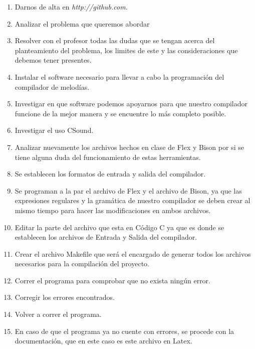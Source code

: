 \documentclass[12pt]{article}
\begin{document}
\begin{enumerate}
\item Darnos de alta en \emph{http://github.com}.
\item Analizar el problema que queremos abordar\\
\item Resolver  con el profesor todas las dudas que se tengan acerca del planteamiento del problema, los limites de este y las consideraciones que debemos tener presentes.\\
\item Instalar el software necesario para llevar a cabo la programación del compilador de melodías.\\
\item Investigar en que software podemos apoyarnos para que nuestro compilador funcione de la mejor manera y se encuentre lo más completo posible.\\
\item Investigar el uso CSound.\\
\item Analizar nuevamente los archivos hechos en clase de Flex y Bison por si se tiene alguna duda del funcionamiento de estas herramientas.\\
\item Se establecen los formatos de entrada y salida del compilador.
\item Se programan a la par el archivo de Flex y el archivo de Bison, ya que las expresiones regulares y la gramática de nuestro compilador se deben crear al mismo tiempo para hacer las modificaciones en ambos archivos.\\
\item Editar la parte del archivo que esta en Código C ya que es donde se establecen los archivos de Entrada y Salida del compilador.\\
\item Crear el archivo Makefile que será el encargado de generar todos los archivos necesarios para la compilación del  proyecto.\\
\item Correr el programa para comprobar que no exista ningún error.\\
\item Corregir los errores encontrados.\\
\item Volver  a correr el programa.\\
\item En caso de que el programa ya no cuente con errores, se procede con la documentación, que en este caso es este archivo en Latex.\\
\end{enumerate}
\end{document}
